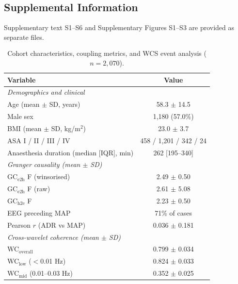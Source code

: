 \documentclass[fleqn,10pt,lineno]{wlpeerj}
\begin{document}
\subsection{Supplemental Information}
Supplementary text S1--S6 and Supplementary Figures S1--S3 are provided as separate files.



\clearpage

\begin{table}[H]
\centering
\caption{Cohort characteristics, coupling metrics, and WCS event analysis ($n = 2{,}070$).}
\label{tab:cohort}
\begin{tabular}{lc}
\toprule
\textbf{Variable} & \textbf{Value} \\
\midrule
\multicolumn{2}{l}{\textit{Demographics and clinical}} \\
Age (mean $\pm$ SD, years)        & 58.3 $\pm$ 14.5 \\
Male sex                          & 1,180 (57.0\%) \\
BMI (mean $\pm$ SD, kg/m$^2$)     & 23.0 $\pm$ 3.7 \\
ASA I / II / III / IV             & 458 / 1,201 / 342 / 24 \\
Anaesthesia duration (median [IQR], min) & 262 [195--340] \\
\midrule
\multicolumn{2}{l}{\textit{Granger causality (mean $\pm$ SD)}} \\
GC$_\text{e2h}$ F (winsorised)    & 2.49 $\pm$ 0.50 \\
GC$_\text{e2h}$ F (raw)           & 2.61 $\pm$ 5.08 \\
GC$_\text{h2e}$ F                 & 2.23 $\pm$ 0.50 \\
EEG preceding MAP                 & 71\% of cases \\
Pearson $r$ (ADR vs MAP)          & 0.036 $\pm$ 0.181 \\
\midrule
\multicolumn{2}{l}{\textit{Cross-wavelet coherence (mean $\pm$ SD)}} \\
WC$_\text{overall}$               & 0.799 $\pm$ 0.034 \\
WC$_\text{low}$ ($<$0.01 Hz)      & 0.824 $\pm$ 0.033 \\
WC$_\text{mid}$ (0.01--0.03 Hz)   & 0.352 $\pm$ 0.025 \\

\end{tabular}
\end{table}
\end{document}
